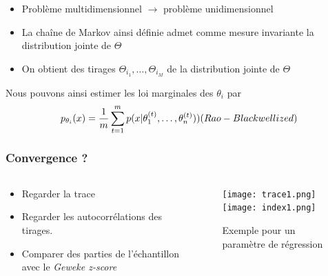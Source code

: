 \begin{frame}
    \begin{itemize}
        \item Problème multidimensionnel $\rightarrow$ problème unidimensionnel
        \item La chaîne de Markov ainsi définie admet comme mesure invariante la distribution jointe de $\Theta$
        \item On obtient des tirages $\Theta_{i_1}, \ldots, \Theta_{i_M}$ de la distribution jointe de $\Theta$
    \end{itemize}    
    Nous pouvons ainsi estimer les loi marginales des $\theta_i$ par 
    $$
     p_{\theta_i}(x) = \frac{1}{m} \sum_{t=1}^{m} p(x | \theta^{(t)}_{1}, \ldots, \theta^{(t)}_{n} )) \hfill (Rao-Blackwellized)
    $$


\end{frame}

\begin{frame}
    \frametitle{Convergence ?}
    \vspace{-1cm}
    \begin{columns}
    \begin{column}{0.3\textwidth}
        
        \begin{itemize}
            \item Regarder la trace 
            \vspace{0.5cm}
            \item Regarder les autocorrélations des tirages.
            \vspace{0.5cm}
            \item Comparer des parties de l'échantillon avec le \emph{Geweke z-score}
        \end{itemize}
    \end{column}
    \begin{column}{0.7\textwidth}  %
        \vspace{-0.5cm}
        \begin{figure}
         \texttt{[image: trace1.png]} 
         \texttt{[image: index1.png]}
         \caption{Exemple pour un paramètre de régression}
        \end{figure}
    \end{column}
    \end{columns}
    \end{frame}

